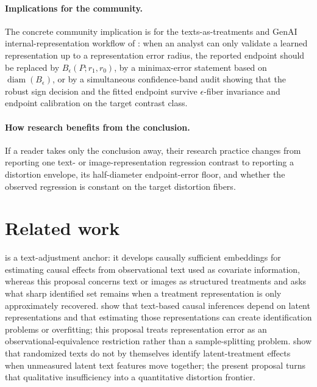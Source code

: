 \documentclass[11pt]{article}
\theoremstyle{definition}
\theoremstyle{plain}
\theoremstyle{remark}
\begin{document}
\paragraph{Implications for the community.}
The concrete community implication is for the texts-as-treatments and GenAI internal-representation workflow of \citet{ImaiNakamura2024TextTreatments}: when an analyst can only validate a learned representation up to a representation error radius, the reported endpoint should be replaced by \(B_\epsilon(P;r_1,r_0)\), by a minimax-error statement based on \(\operatorname{diam}(B_\epsilon)\), or by a simultaneous confidence-band audit showing that the robust sign decision and the fitted endpoint survive \(\epsilon\)-fiber invariance and endpoint calibration on the target contrast class.

\paragraph{How research benefits from the conclusion.}
If a reader takes only the conclusion away, their research practice changes from reporting one text- or image-representation regression contrast to reporting a distortion envelope, its half-diameter endpoint-error floor, and whether the observed regression is constant on the target distortion fibers.

\section{Related work}
\citet{VeitchSridharBlei2020} is a text-adjustment anchor: it develops causally sufficient embeddings for estimating causal effects from observational text used as covariate information, whereas this proposal concerns text or images as structured treatments and asks what sharp identified set remains when a treatment representation is only approximately recovered.  \citet{EgamiFongGrimmerRobertsStewart2022} show that text-based causal inferences depend on latent representations and that estimating those representations can create identification problems or overfitting; this proposal treats representation error as an observational-equivalence restriction rather than a sample-splitting problem.  \citet{FongGrimmer2023} show that randomized texts do not by themselves identify latent-treatment effects when unmeasured latent text features move together; the present proposal turns that qualitative insufficiency into a quantitative distortion frontier.
\end{document}
